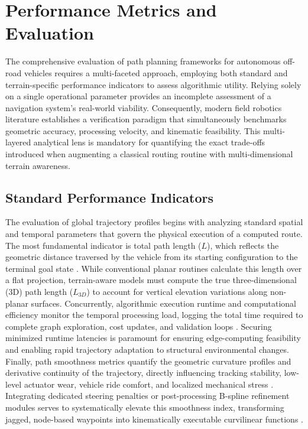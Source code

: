 \section{Performance Metrics and Evaluation}

The comprehensive evaluation of path planning frameworks for autonomous off-road vehicles requires a
multi-faceted approach, employing both standard and terrain-specific performance indicators to
assess algorithmic utility. Relying solely on a single operational parameter provides an incomplete
assessment of a navigation system's real-world viability. Consequently, modern field robotics
literature establishes a verification paradigm that simultaneously benchmarks geometric accuracy,
processing velocity, and kinematic feasibility. This multi-layered analytical lens is mandatory for
quantifying the exact trade-offs introduced when augmenting a classical routing routine with
multi-dimensional terrain awareness.

\subsection{Standard Performance Indicators}

The evaluation of global trajectory profiles begins with analyzing standard spatial and temporal
parameters that govern the physical execution of a computed route. The most fundamental indicator is
total path length ($L$), which reflects the geometric distance traversed by the vehicle from its
starting configuration to the terminal goal state \citep{Jiang_2021_pathplanning, Zhuang_2019_improvedastar, Nazarahari_2019_multiobjectivemultirobot}. While conventional
planar routines calculate this length over a flat projection, terrain-aware models must compute the
true three-dimensional (3D) path length ($L_{3D}$) to account for vertical elevation variations
along non-planar surfaces. Concurrently, algorithmic execution runtime and computational efficiency
monitor the temporal processing load, logging the total time required to complete graph exploration,
cost updates, and validation loops \citep{Mac_2016_heuristicapproach, Liu_2023_autonomousnavigation, Injarapu_2023_surveyautonomous, Nazarahari_2019_multiobjectivemultirobot, Ducho_2014_pathplanning}. Securing minimized
runtime latencies is paramount for ensuring edge-computing feasibility and enabling rapid trajectory
adaptation to structural environmental changes. Finally, path smoothness metrics quantify the
geometric curvature profiles and derivative continuity of the trajectory, directly influencing
tracking stability, low-level actuator wear, vehicle ride comfort, and localized mechanical stress
\citep{Karur_2021_surveypath, Karur_2021_surveypath, Nazarahari_2019_multiobjectivemultirobot, Li_2019_rolloverfreepath}. Integrating dedicated steering penalties or post-processing
B-spline refinement modules serves to systematically elevate this smoothness index, transforming
jagged, node-based waypoints into kinematically executable curvilinear functions \citep{Karur_2021_surveypath,
Zhang_2021_mobilerobot}.

